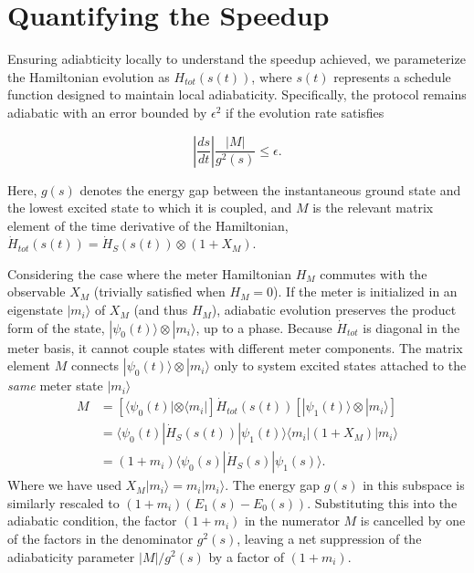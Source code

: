 
\section{Quantifying the Speedup}
\qquad Ensuring adiabticity locally to understand the speedup achieved, we parameterize the Hamiltonian evolution as $H_{tot}(s(t))$, where $s(t)$ represents a schedule function designed to maintain local adiabaticity.\cite{LocalAdiabticQuantumSearch} Specifically, the protocol remains adiabatic with an error bounded by $\epsilon^2$ if the evolution rate satisfies

\begin{equation}
    \left|\frac{ds}{dt}\right| \frac{|M|}{g^2(s)} \leq \epsilon.
\end{equation}

Here, $g(s)$ denotes the energy gap between the instantaneous ground state and the lowest excited state to which it is coupled, and $M$ is the relevant matrix element of the time derivative of the Hamiltonian, $\dot{H}_{tot}(s(t)) = \dot{H}_S(s(t)) \otimes (1+X_M)$.

\qquad Considering the case where the meter Hamiltonian $H_M$ commutes with the observable $X_M$ (trivially satisfied when $H_M=0$). If the meter is initialized in an eigenstate $|m_i\rangle$ of $X_M$ (and thus $H_M$), adiabatic evolution preserves the product form of the state, $|\psi_0(t)\rangle \otimes |m_i\rangle$, up to a phase. Because $\dot{H}_{tot}$ is diagonal in the meter basis, it cannot couple states with different meter components. The matrix element $M$ connects $|\psi_0(t)\rangle \otimes |m_i\rangle$ only to system excited states attached to the \textit{same} meter state $|m_i\rangle$
\begin{align}
    M &= [\langle\psi_0(t)| \otimes \langle m_i|] \dot{H}_{tot}(s(t)) [|\psi_1(t)\rangle \otimes |m_i\rangle] \nonumber \\
      &= \langle\psi_0(t)| \dot{H}_S(s(t)) |\psi_1(t)\rangle \langle m_i| (1+X_M) |m_i\rangle \nonumber \\
      &= (1+m_i) \langle\psi_0(s)| \dot{H}_S(s) |\psi_1(s)\rangle.
\end{align}
Where we have used $X_M|m_i\rangle = m_i|m_i\rangle$. The energy gap $g(s)$ in this subspace is similarly rescaled to $(1+m_i)(E_1(s) - E_0(s))$. Substituting this into the adiabatic condition, the factor $(1+m_i)$ in the numerator $M$ is cancelled by one of the factors in the denominator $g^2(s)$, leaving a net suppression of the adiabaticity parameter $|M|/g^2(s)$ by a factor of $(1+m_i)$.

